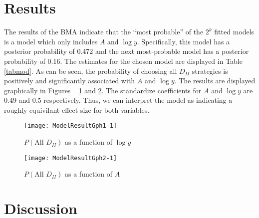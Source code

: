 \begin{table}[ht]
\centering
\caption{Model Results} 
\label{tabmod}
\end{table}


\section{Results}
\label{sec:results}

The results of the BMA indicate that the ``most probable'' of the $2^k$ fitted models is a model which only includes $A$ and $\log{y}$. Specifically, this model has a posterior probability of 0.472 and the next most-probable model has a posterior probability of 0.16. The estimates for the chosen model are displayed in Table ~ \ref{tabmod}. As can be seen, the probability of choosing all $D_{II}$ strategies is positively and significantly associated with $A$ and $\log{y}$. The results are displayed graphically in Figures ~ \ref{modModelResultGph1} and \ref{modModelResultGph2}. The standardize coefficients for $A$ and $\log{y}$ are 0.49 and 0.5 respectively. Thus, we can interpret the model as indicating a roughly equivilant effect size for both variables. 


\begin{figure}
\texttt{[image: ModelResultGph1-1]} \caption[]{$P(\text{All } D_{II})$ as a function of $\log{y}$\label{modModelResultGph1}}
\end{figure}



\begin{figure}
\texttt{[image: ModelResultGph2-1]} \caption[]{$P(\text{All } D_{II})$ as a function of $A$\label{modModelResultGph2}}
\end{figure}




\section{Discussion}\label{discussion}

